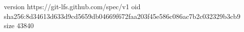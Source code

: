 version https://git-lfs.github.com/spec/v1
oid sha256:8d34613d633d9cd5659db04669f672faa203f45e586c086ac7b2c032329b3cb9
size 43840
